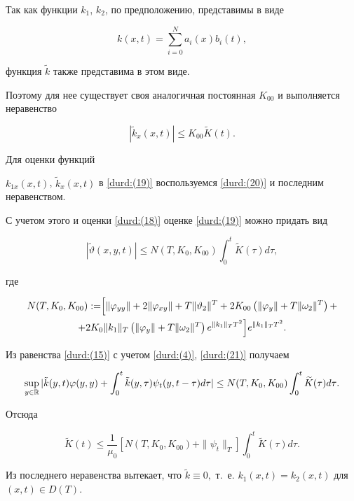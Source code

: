 Так как функции $k_{1}$, $k_{2}$, по предположению, представимы в виде 

$$k(x,t)=\sum _{i=0}^{N}a_{i}(x)b_{i}(t),$$ 

функция $\tilde{k}$ также представима в этом  виде.

 Поэтому для нее существует своя аналогичная постоянная $K_{00}$ и выполняется неравенство  

 $$|\tilde{k}_x(x,t)|\leq K_{00} \widetilde{K}(t).$$ 

 

Для оценки функций

  $k_{1x}(x,t)$, $\tilde{k}_x(x,t)$ в \eqref{durd:(19)} воспользуемся \eqref{durd:(20)} и  последним неравенством.

С учетом этого и оценки \eqref{durd:(18)} оценке \eqref{durd:(19)} можно придать вид

\begin{equation}

|\widetilde{\vartheta}(x,y,t)|\leq{N(T,K_{0},K_{00})\int^{t}_{0}\widetilde{K}(\tau)d\tau},

\label{durd:(21)}

\end{equation}

где

\begin{multline}

N(T,K_{0},K_{00}):=\Bigr[\|\varphi_{yy}\|+2\|\varphi_{xy}\|+T\|\vartheta_{2}\|^{T}+2K_{00}\left(\|\varphi_y\|+T\|\omega_{2}\|^{T}\right)+

\\

+2K_0\|k_1\|_T\left(\|\varphi_y\|+T\|\omega_{2}\|^T\right)e^{\|k_{1}\|_{T}T^2}\Bigl]e^{\|k_{1}\|_{T}T^2}.

\end{multline}



Из равенства \eqref{durd:(15)} с учетом \eqref{durd:(4)}, \eqref{durd:(21)} получаем

$$\sup_{y\in{\Bbb R}}|\tilde{k}(y,t)\varphi(y,y)+\int^{t}_{0}\tilde{k}(y,\tau)\psi_{t}(y,t-\tau)d\tau|\leq{N(T,K_{0},K_{00})\int^{t}_{0}\widetilde{K}(\tau)d\tau}.$$

Отсюда

$$\widetilde{K}(t)\leq\frac{1}{\mu_{0}}\left[N(T,K_{0}, K_{00})+\|\psi_t\|_T\right]\int^{t}_{0}\widetilde{K}(\tau)d\tau. 

$$

Из последнего неравенства вытекает, что $\tilde{k}\equiv 0,$ т.~е. $k_1(x,t)=k_2(x,t)$ для $(x,t)\in D(T).$ 

